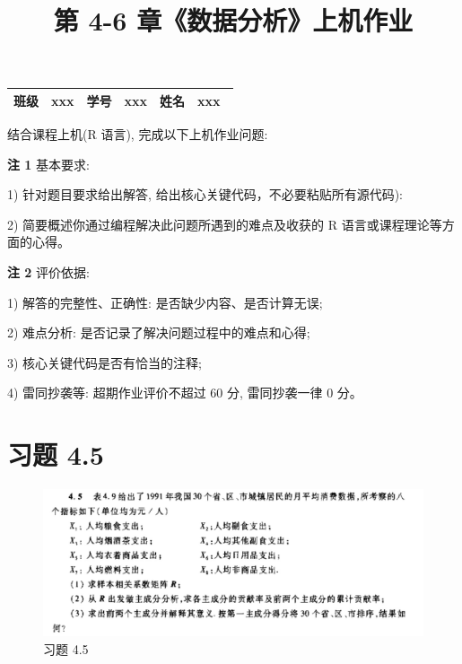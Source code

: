 \documentclass[11pt]{article}
\title{第 4-6 章《数据分析》上机作业}
\begin{document}
    


\fancypage{\fbox}{}

\begin{table}[h]
\begin{tabularx}{\textwidth}{l|l|l|l|l|l}
    \bfseries{班级\qquad\qquad} & xxx &
    \bfseries{学号\qquad\qquad} & xxx &
    \bfseries{姓名\qquad\qquad} & {xxx \quad\,} \\
    \hline
    \hline
\end{tabularx}
\end{table}

\begin{flushleft}
结合课程上机(R 语言), 完成以下上机作业问题:

{\bfseries{注 1}} 基本要求: 

1) 针对题目要求给出解答, 给出核心关键代码，不必要粘贴所有源代码): 

2) 简要概述你通过编程解决此问题所遇到的难点及收获的 R 语言或课程理论等方面的心得。 

{\bfseries{注 2}} 评价依据: 

1) 解答的完整性、正确性: 是否缺少内容、是否计算无误;     

2) 难点分析: 是否记录了解决问题过程中的难点和心得;     

3) 核心关键代码是否有恰当的注释;     

4) 雷同抄袭等: 超期作业评价不超过 60 分, 雷同抄袭一律 0 分。     
\end{flushleft}
    



    \hypertarget{ux4e60ux9898-4.5}{%
\section{习题 4.5}\label{ux4e60ux9898-4.5}}

\begin{figure}
\centering
\includegraphics{ex_4_5_files/008i3skNly1gr9qnd43plj31a40hun3k.jpg}
\caption{习题 4.5}
\end{figure}
\end{document}
